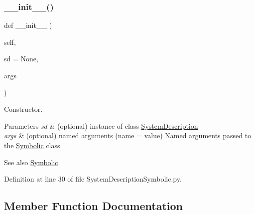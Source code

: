 \subsubsection{\texorpdfstring{\+\_\+\+\_\+init\+\_\+\+\_\+()}{\_\_init\_\_()}}
{\footnotesize\ttfamily def \+\_\+\+\_\+init\+\_\+\+\_\+ (\begin{DoxyParamCaption}\item[{}]{self,  }\item[{}]{sd = {\ttfamily None},  }\item[{}]{args }\end{DoxyParamCaption})}



Constructor. 


\begin{DoxyParams}{Parameters}
{\em sd} & (optional) instance of class \hyperlink{namespaceSignalIntegrity_1_1SystemDescriptions_1_1SystemDescription}{System\+Description} \\
\hline
{\em args} & (optional) named arguments (name = value) Named arguments passed to the \hyperlink{namespaceSignalIntegrity_1_1SystemDescriptions_1_1Symbolic}{Symbolic} class \\
\hline
\end{DoxyParams}
\begin{DoxySeeAlso}{See also}
\hyperlink{namespaceSignalIntegrity_1_1SystemDescriptions_1_1Symbolic}{Symbolic} 
\end{DoxySeeAlso}


Definition at line 30 of file System\+Description\+Symbolic.\+py.



\subsection{Member Function Documentation}
\mbox{\label{classSignalIntegrity_1_1SystemDescriptions_1_1SystemDescriptionSymbolic_1_1SystemDescriptionSymbolic_ab91378c2a97ec0d38ee1c70988142eb5}} 
